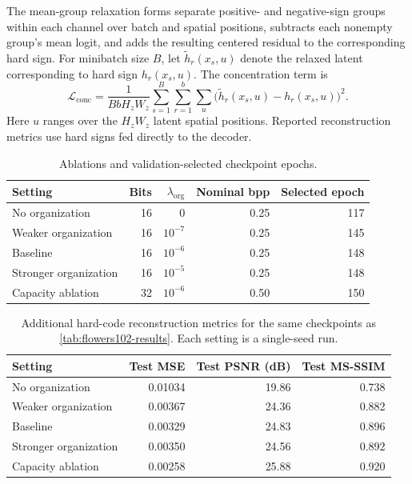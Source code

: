 The mean-group relaxation forms separate positive- and negative-sign groups within each channel over batch and spatial positions, subtracts each nonempty group's mean logit, and adds the resulting centered residual to the corresponding hard sign.
For minibatch size $B$, let $\tilde h_r(x_s,u)$ denote the relaxed latent corresponding to hard sign $h_r(x_s,u)$.
The concentration term is
\begin{equation}
\mathcal L_{\mathrm{conc}}
=\frac{1}{B b H_z W_z}
\sum_{s=1}^{B}\sum_{r=1}^{b}\sum_u
\bigl(\tilde h_r(x_s,u)-h_r(x_s,u)\bigr)^2.
\label{eq:concentration-reduction}
\end{equation}
Here $u$ ranges over the $H_zW_z$ latent spatial positions.
Reported reconstruction metrics use hard signs fed directly to the decoder.

\begin{table}[htbp]
\centering\small
\begin{tabular}{lrrrr}
\toprule
Setting & Bits & $\lambda_{\mathrm{org}}$ & Nominal bpp & Selected epoch \\
\midrule
No organization & 16 & $0$ & 0.25 & 117 \\
Weaker organization & 16 & $10^{-7}$ & 0.25 & 145 \\
Baseline & 16 & $10^{-6}$ & 0.25 & 148 \\
Stronger organization & 16 & $10^{-5}$ & 0.25 & 148 \\
Capacity ablation & 32 & $10^{-6}$ & 0.50 & 150 \\
\bottomrule
\end{tabular}
\caption{Ablations and validation-selected checkpoint epochs.}
\label{tab:flowers102-ablation-settings}
\end{table}

\begin{table}[htbp]
\centering\small
\begin{tabular}{lrrr}
\toprule
Setting & Test MSE & Test PSNR (dB) & Test MS-SSIM \\
\midrule
No organization & 0.01034 & 19.86 & 0.738 \\
Weaker organization & 0.00367 & 24.36 & 0.882 \\
Baseline & 0.00329 & 24.83 & 0.896 \\
Stronger organization & 0.00350 & 24.56 & 0.892 \\
Capacity ablation & 0.00258 & 25.88 & 0.920 \\
\bottomrule
\end{tabular}
\caption{Additional hard-code reconstruction metrics for the same checkpoints as \cref{tab:flowers102-results}. Each setting is a single-seed run.}
\label{tab:flowers102-reconstruction-metrics}
\end{table}

